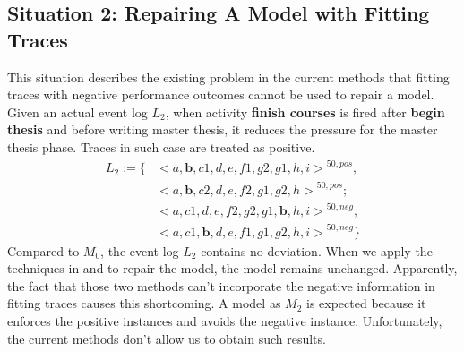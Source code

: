 \subsection{Situation 2: \small{Repairing A Model with Fitting Traces}}
This situation describes the existing problem in the current methods that fitting traces with negative performance outcomes cannot be used to repair a model. Given an actual event log $L_2$, when activity \textbf{finish courses} is fired after \textbf{begin thesis} and before writing master thesis, it reduces the pressure for the master thesis phase. Traces in such case are treated as positive.
\begin{align*}
L_2:=\{ & { <a,\textbf{b},c1,d,e,f1,g2,g1,h,i>}^{50, pos} , \\   &{<a,\textbf{b},c2,d,e,f2,g1,g2,h>}^{50, pos};   \\
& {<a,c1,d,e,f2,g2,g1,\textbf{b},h,i>}^{50, neg} , \\
& {<a,c1,\textbf{b},d,e,f1,g1,g2,h,i>}^{50, neg}  \}
\end{align*}
Compared to $M_0$, the event log $L_2$ contains no deviation. When we apply the techniques in  \cite{fahland2015model} and  \cite{dees2017enhancing} to repair the model, the model remains unchanged. Apparently, the fact that those two methods can't incorporate the negative information in fitting traces causes this shortcoming. A model as $M_2$ is expected because it enforces the positive instances and avoids the negative instance. Unfortunately, the current methods don't allow us to obtain such results. 
